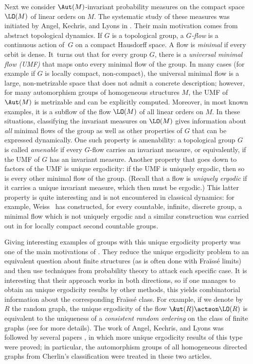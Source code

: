 Next we consider $\Aut(M)$-invariant probability measures on the compact space $\LO(M)$ of linear orders on $M$. The systematic study of these measures was initiated by Angel, Kechris, and Lyons in \cite{Angel2014}. Their main motivation comes from abstract topological dynamics. If $G$ is a topological group, a \emph{$G$-flow} is a continuous action of~$G$ on a compact Hausdorff space. A flow is \emph{minimal} if every orbit is dense. It~turns out that for every group $G$, there is a \emph{universal minimal flow (UMF)} that maps onto every minimal flow of the group. In many cases (for example if $G$ is locally compact, non-compact), the universal minimal flow is a large, non-metrizable space that does not admit a concrete description; however, for many automorphism groups of homogeneous structures $M$, the UMF of $\Aut(M)$ is metrizable and can be explicitly computed. Moreover, in most known examples, it is a subflow of the flow $\LO(M)$ of all linear orders on $M$. In these situations, classifying the invariant measures on $\LO(M)$ gives information about \emph{all} minimal flows of the group as well as other properties of $G$ that can be expressed dynamically. One such property is amenability: a topological group $G$ is called \emph{amenable} if every $G$-flow carries an invariant measure, or equivalently, if the UMF of $G$ has an invariant measure. Another property that goes down to factors of the UMF is unique ergodicity: if the UMF is uniquely ergodic, then so is every other minimal flow of the group. (Recall that a flow is \emph{uniquely ergodic} if it carries a unique invariant measure, which then must be ergodic.) This latter property is quite interesting and is not encountered in classical dynamics: for example, Weiss~\cite{Weiss2012} has constructed, for every countable, infinite, discrete group, a minimal flow which is not uniquely ergodic and a similar construction was carried out in \cite{Jahel2020p} for locally compact second countable groups.

Giving interesting examples of groups with this unique ergodicity property was one of the main motivations of \cite{Angel2014}. They reduce the unique ergodicity problem to an equivalent question about finite structures (as is often done with Fraïssé limits) and then use techniques from probability theory to attack each specific case. It is interesting that their approach works in both directions, so if one manages to obtain an unique ergodicity results by other methods, this yields combinatorial information about the corresponding Fraïssé class. For example, if we denote by $R$ the random graph, the unique ergodicity of the flow $\Aut(R) \actson \LO(R)$ is equivalent to the uniqueness of a \emph{consistent random ordering} on the class of finite graphs (see \cite{Angel2014} for more details). The work of Angel, Kechris, and Lyons was followed by several papers \cite{Pawliuk2020, Jahel2019p}, in which more unique ergodicity results of this type were proved; in particular, the automorphism groups of all homogeneous directed graphs from Cherlin's classification were treated in these two articles.

